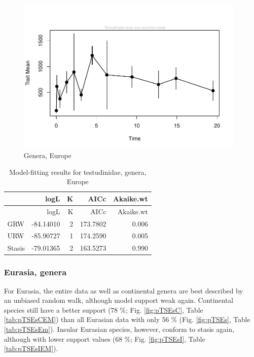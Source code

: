 \begin{figure}[H]
	\centering
	\includegraphics{MA_JJ_files/figure-latex/paleoTSEurope-1.pdf}
	\caption{Genera, Europe}
	\label{fig:pTSEu}
\end{figure}

\begin{longtable}[]{@{}lrrrr@{}}
	\caption{Model-fitting results for testudinidae, genera,
		Europe}
	\label{tab:pTSEuEM}\tabularnewline
	\toprule
	& logL & K & AICc & Akaike.wt\tabularnewline
	\midrule
	\endfirsthead
	\toprule
	& logL & K & AICc & Akaike.wt\tabularnewline
	\midrule
	\endhead
	GRW & -84.14010 & 2 & 173.7802 & 0.006\tabularnewline
	URW & -85.90727 & 1 & 174.2590 & 0.005\tabularnewline
	Stasis & -79.01365 & 2 & 163.5273 & 0.990\tabularnewline
	\bottomrule
\end{longtable}

\FloatBarrier



\subsubsection{Eurasia,	genera}\label{eurasia-genera}


For Eurasia, the entire data as well as continental genera are best described by an unbiased random walk, although model support weak again. Continental species still have a better support (78 \%; Fig. \ref{fig:pTSEsC}, Table \ref{tab:pTSEsCEM}) than all Eurasian data with only 56 \% (Fig. \ref{fig:pTSEs}, Table \ref{tab:pTSEsEm}). Insular Eurasian species, however, conform to stasis again, although with lower support values (68 \%; Fig. \ref{fig:pTSEsI}, Table \ref{tab:pTSEsIEM}).



